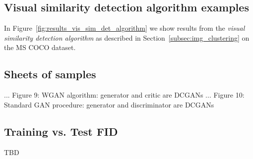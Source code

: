 \documentclass[12pt,a4paper]{article}
\begin{document}
\begin{appendices}
\subsection{Visual similarity detection algorithm examples}\label{app:vsda_examples}
In Figure~\ref{fig:results_vis_sim_det_algorithm} we show results from the \textit{visual similarity detection algorithm} as described in Section~\ref{subsec:img_clustering} on the MS COCO dataset.


\subsection{Sheets of samples}\label{app:samples}
...
Figure 9: WGAN algorithm: generator and critic are DCGANs
...
Figure 10: Standard GAN procedure: generator and discriminator are DCGANs

\subsection{Training vs. Test FID}\label{app:train_vs_test_FID}
TBD

\end{appendices}
\end{document}
